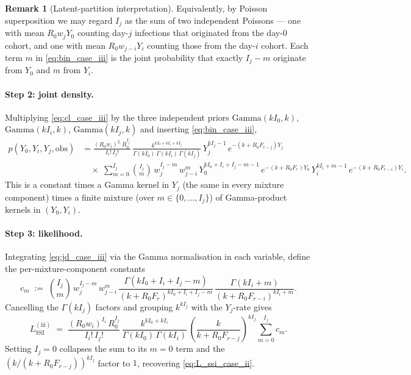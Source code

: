 \documentclass{article}
\theoremstyle{definition}
\newtheorem*{remark}{Remark}
\begin{document}
\begin{remark}[Latent-partition interpretation]
  Equivalently, by Poisson superposition we may regard $I_j$ as the
  sum of two independent Poissons --- one with mean $R_0 w_j Y_0$
  counting day-$j$ infections that originated from the day-$0$
  cohort, and one with mean $R_0 w_{j-i} Y_i$ counting those from the
  day-$i$ cohort.  Each term $m$ in \eqref{eq:bin_case_iii} is the
  joint probability that exactly $I_j - m$ originate from $Y_0$ and
  $m$ from $Y_i$.
\end{remark}

\paragraph{Step 2: joint density.}
Multiplying \eqref{eq:cl_case_iii} by the three independent priors
$\mathrm{Gamma}(k I_0, k)$, $\mathrm{Gamma}(k I_i, k)$,
$\mathrm{Gamma}(k I_j, k)$ and inserting \eqref{eq:bin_case_iii},
\begin{equation}\label{eq:jd_case_iii}
  \begin{aligned}
    p(Y_0, Y_i, Y_j, \mathrm{obs})
    &= \frac{(R_0 w_i)^{I_i}\, R_0^{I_j}}{I_i!\, I_j!}\,
    \frac{k^{k I_0 + k I_i + k I_j}}{\Gamma(k I_0)\, \Gamma(k I_i)\,
    \Gamma(k I_j)}\,
    Y_j^{k I_j - 1}\, e^{-(k + R_0 F_{r-j}) Y_j}\\[2pt]
    &\quad\times\;\sum_{m=0}^{I_j} \binom{I_j}{m}\, w_j^{I_j - m}\,
    w_{j-i}^{m}\,
    Y_0^{k I_0 + I_i + I_j - m - 1}\, e^{-(k + R_0 F_r) Y_0}\,
    Y_i^{k I_i + m - 1}\, e^{-(k + R_0 F_{r-i}) Y_i}.
  \end{aligned}
\end{equation}
This is a constant times a Gamma kernel in $Y_j$ (the same in every
mixture component) times a finite mixture (over
$m \in \{0, \ldots, I_j\}$) of Gamma-product kernels in $(Y_0, Y_i)$.

\paragraph{Step 3: likelihood.}
Integrating \eqref{eq:jd_case_iii} via the Gamma normalisation in each
variable, define the per-mixture-component constants
\begin{equation}\label{eq:cm_case_iii}
  c_m \;:=\; \binom{I_j}{m}\, w_j^{I_j - m}\, w_{j-i}^{m}\,
  \frac{\Gamma(k I_0 + I_i + I_j - m)}{(k + R_0 F_r)^{k I_0 + I_i + I_j - m}}\,
  \frac{\Gamma(k I_i + m)}{(k + R_0 F_{r-i})^{k I_i + m}}.
\end{equation}
Cancelling the $\Gamma(k I_j)$ factors and grouping $k^{k I_j}$ with
the $Y_j$-rate gives
\begin{equation}\label{eq:L_ssi_case_iii}
  L_\mathrm{SSI}^{(\mathrm{iii})}
  \;=\; \frac{(R_0 w_i)^{I_i}\, R_0^{I_j}}{I_i!\, I_j!}\,
  \frac{k^{k I_0 + k I_i}}{\Gamma(k I_0)\, \Gamma(k I_i)}\,
  \left(\frac{k}{k + R_0 F_{r-j}}\right)^{k I_j}
  \sum_{m=0}^{I_j} c_m.
\end{equation}
Setting $I_j = 0$ collapses the sum to its $m = 0$ term and the
$(k/(k + R_0 F_{r-j}))^{k I_j}$ factor to $1$, recovering
\eqref{eq:L_ssi_case_ii}.
\end{document}
